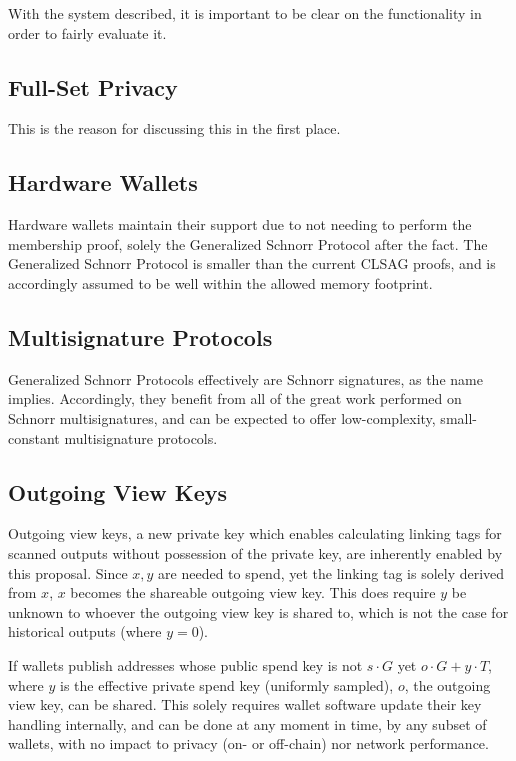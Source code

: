 \documentclass[]{article}
\begin{document}
With the system described, it is important to be clear on the functionality in order to fairly evaluate it.

\subsection{Full-Set Privacy}

This is the reason for discussing this in the first place.

\subsection{Hardware Wallets}

Hardware wallets maintain their support due to not needing to perform the membership proof, solely the Generalized Schnorr Protocol after the fact. The Generalized Schnorr Protocol is smaller than the current CLSAG proofs, and is accordingly assumed to be well within the allowed memory footprint.

\subsection{Multisignature Protocols}

Generalized Schnorr Protocols effectively are Schnorr signatures, as the name implies. Accordingly, they benefit from all of the great work performed on Schnorr multisignatures, and can be expected to offer low-complexity, small-constant multisignature protocols.

\subsection{Outgoing View Keys}

Outgoing view keys, a new private key which enables calculating linking tags for scanned outputs without possession of the private key, are inherently enabled by this proposal. Since $x, y$ are needed to spend, yet the linking tag is solely derived from $x$, $x$ becomes the shareable outgoing view key. This does require $y$ be unknown to whoever the outgoing view key is shared to, which is not the case for historical outputs (where $y = 0$).

If wallets publish addresses whose public spend key is not $s \cdot G$ yet $o \cdot G + y \cdot T$, where $y$ is the effective private spend key (uniformly sampled), $o$, the outgoing view key, can be shared. This solely requires wallet software update their key handling internally, and can be done at any moment in time, by any subset of wallets, with no impact to privacy (on- or off-chain) nor network performance.
\end{document}
